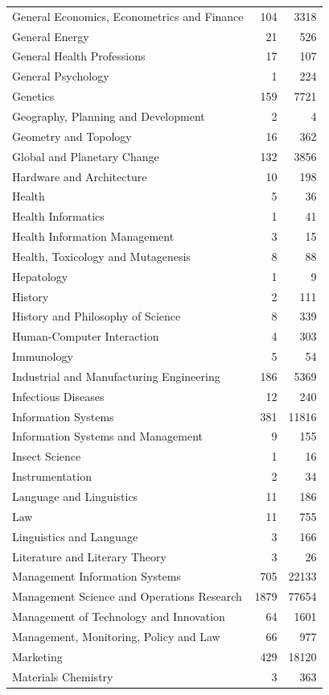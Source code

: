 \documentclass[
  12pt,
]{article}
\begin{document}
\begin{longtable}[t]{|>{}lr>{}r|}
General Economics, Econometrics and Finance & 104 & 3318\\
General Energy & 21 & 526\\
General Health Professions & 17 & 107\\
General Psychology & 1 & 224\\
Genetics & 159 & 7721\\
Geography, Planning and Development & 2 & 4\\
Geometry and Topology & 16 & 362\\
Global and Planetary Change & 132 & 3856\\
Hardware and Architecture & 10 & 198\\
Health & 5 & 36\\
Health Informatics & 1 & 41\\
Health Information Management & 3 & 15\\
Health, Toxicology and Mutagenesis & 8 & 88\\
Hepatology & 1 & 9\\
History & 2 & 111\\
History and Philosophy of Science & 8 & 339\\
Human-Computer Interaction & 4 & 303\\
Immunology & 5 & 54\\
Industrial and Manufacturing Engineering & 186 & 5369\\
Infectious Diseases & 12 & 240\\
Information Systems & 381 & 11816\\
Information Systems and Management & 9 & 155\\
Insect Science & 1 & 16\\
Instrumentation & 2 & 34\\
Language and Linguistics & 11 & 186\\
Law & 11 & 755\\
Linguistics and Language & 3 & 166\\
Literature and Literary Theory & 3 & 26\\
Management Information Systems & 705 & 22133\\
Management Science and Operations Research & 1879 & 77654\\
Management of Technology and Innovation & 64 & 1601\\
Management, Monitoring, Policy and Law & 66 & 977\\
Marketing & 429 & 18120\\
Materials Chemistry & 3 & 363\\

\end{longtable}
\end{document}
